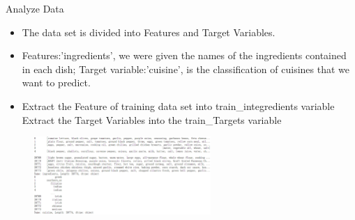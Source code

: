 \documentclass[
 size=14pt,
 paper=smartboard,  %
 mode=present, 		%
 display=slides, 	%
 style=tuliplab,  	%
 pauseslide,
 fleqn,leqno]{powerdot}
\begin{document}
\begin{slide}{Analyze Data}
  \begin{center}

    {
      \begin{itemize}
      
        \item The data set is divided into Features and Target Variables.
        \item Features:'ingredients', we were given the names of the ingredients contained in each dish;
        Target variable:'cuisine', is the classification of cuisines that we want to predict.
        \item Extract the Feature of training data set into train\_integredients variable
              Extract the Target Variables into the train\_Targets variable
      \end{itemize} 
      
    
      \begin{figure}
        \centering
  
        \includegraphics[width=0.6\textwidth]{pic01/b.eps} 
        
      \end{figure}   
        
       
    }
    \end{center}
  \bigskip
    \begin{center}
    
    \end{center}
  \bigskip



\end{slide}
\end{document}
